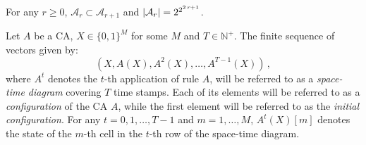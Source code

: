 \begin{fact}
	For any $r\geq 0$, $\mathcal{A}_r \subset \mathcal{A}_{r+1}$ and $\lvert\mathcal{A}_r\rvert = 2^{2^{2\,r+1}}$.\label{fac:incl}\end{fact}

Let $A$ be a CA, $X\in \{0,1\}^M$ for some $M$ and $T\in\mathbb{N}^+$. The finite sequence of vectors given by:
\[(X, A(X), A^2(X), \dotsc, A^{T-1}(X))\,,\]
where $A^t$ denotes the $t$-th application of rule $A$, will be referred to as a \emph{space-time diagram} covering $T$ time stamps. Each of its elements will be referred to as a \emph{configuration} of the CA $A$, while the first element will be referred to as the \emph{initial configuration}. For any $t=0,1,\dotsc,T-1$ and $m=1,\dotsc,M$, $A^t(X)[m]$ denotes the state of the $m$-th cell in the $t$-th row of the space-time diagram.

